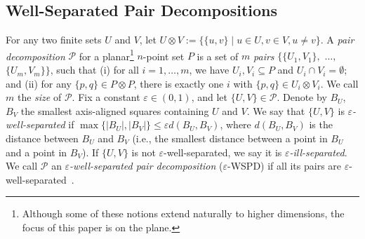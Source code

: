 \documentclass[11pt]{paper}
\newcommand {\eps} {\varepsilon}
\newcommand {\eqdef} {:=}
\begin{document}
 \subsection {Well-Separated Pair Decompositions}

    For any two finite sets $U$ and $V$, let
    $U \otimes V \eqdef \{\{u,v\} \mid u \in U, v \in V, u \neq v\}$.
    A \emph {pair decomposition}
    $\mathcal{P}$ for a planar\footnote
    {Although some of these notions extend naturally to higher dimensions,
    the focus of this paper is on the plane.}
    $n$-point set $P$ is a set of $m$ \emph {pairs}
    $\{\{U_1, V_1\},$ $\ldots,$ $\{U_m,V_m\}\}$, such
    that
    (i) for all $i = 1, \ldots, m$, we have $U_i, V_i \subseteq P$ and
       $U_i \cap V_i = \emptyset$; and
    (ii) for any $\{p, q\} \in P \otimes P$, there is exactly one $i$ with
      $\{p, q\} \in U_i \otimes V_i$.
    We call $m$ the \emph{size} of $\mathcal{P}$.
    Fix a constant $\eps \in (0,1)$, and let $\{U, V\} \in \mathcal{P}$.
    Denote by $B_U$, $B_V$ the smallest axis-aligned squares containing
    $U$ and $V$. We say that $\{U,V\}$
    is \emph{$\eps$-well-separated} if $\max\{|B_U|, |B_V|\} \leq \eps 
    d(B_U,B_V)$,
    where $d(B_U,B_V)$ is the distance between $B_U$ and $B_V$ (i.e.,
    the smallest distance
    between a point in $B_U$ and a point in $B_V$).
    If $\{U,V\}$ is not $\eps$-well-separated, we say it is
    \emph{$\eps$-ill-separated}.
    We call $\mathcal{P}$ an
    \emph {$\eps$-well-separated pair decomposition} ($\eps$-WSPD)
    if all its pairs are
    $\eps$-well-separated~\cite{CallahanKo93,CallahanKo95,Eppstein00,HarPeled11}.
\end{document}
